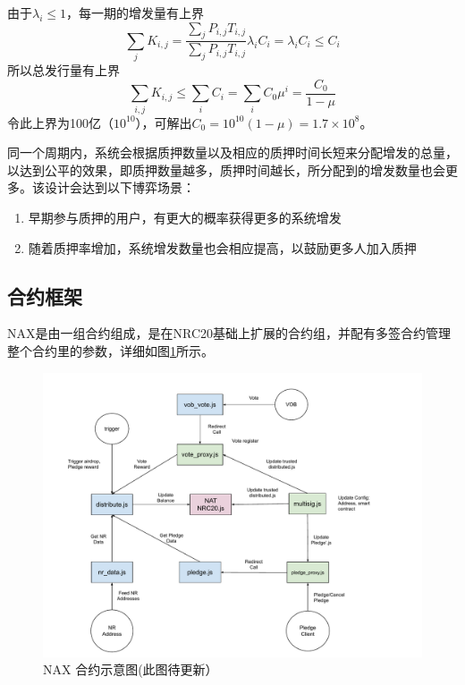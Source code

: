 由于\(\lambda_i \le 1\)，每一期的增发量有上界
\begin{equation}
  \sum_j K_{i,j} = \frac{\sum_j P_{i,j} T_{i,j}}{\sum_j P_{i,j} T_{i,j}} \lambda_i C_i = \lambda_i C_i \le C_i
\end{equation}
所以总发行量有上界
\begin{equation}
  \sum_{i,j} K_{i,j} \le \sum_i C_i = \sum_i C_0 \mu^i = \frac{C_0}{1-\mu}
\end{equation}
令此上界为100亿（\(10^{10}\)），可解出\(C_0 = 10^{10}(1-\mu) = 1.7\times10^8\)。


同一个周期内，系统会根据质押数量以及相应的质押时间长短来分配增发的总量，以达到公平的效果，即质押数量越多，质押时间越长，所分配到的增发数量也会更多。该设计会达到以下博弈场景：
\begin{enumerate}
  \item 早期参与质押的用户，有更大的概率获得更多的系统增发
  \item 随着质押率增加，系统增发数量也会相应提高，以鼓励更多人加入质押
\end{enumerate}

\subsection{合约框架}
NAX是由一组合约组成，是在NRC20基础上扩展的合约组，并配有多签合约管理整个合约里的参数，详细如图\ref{fig:nax_framework}所示。

\begin{figure}[htbp]
  \centering
    \includegraphics[width=1\textwidth]{../common/ch/nax.pdf}
    \caption{NAX 合约示意图(此图待更新） \label{fig:nax_framework}}
\end{figure}
